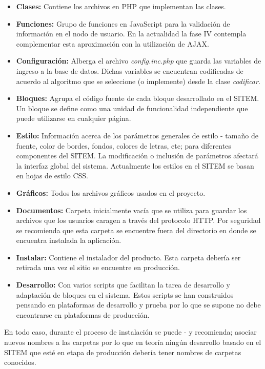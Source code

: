 \begin{itemize}
 \item \textbf{Clases:} Contiene los archivos en PHP que implementan las clases. 
\item \textbf{Funciones:} Grupo de funciones en JavaScript para la validación de información en el nodo de usuario. En la actualidad la fase IV contempla complementar esta aproximación con la utilización de AJAX.
\item \textbf{Configuración:} Alberga el archivo \textit{config.inc.php} que guarda las variables de ingreso a la base de datos. Dichas variables se encuentran codificadas de acuerdo al algoritmo que se seleccione (o implemente) desde la clase \textit{codificar}.
\item \textbf{Bloques:} Agrupa el código fuente de cada bloque desarrollado en el SITEM. Un bloque se define como una unidad de funcionalidad independiente que puede utilizarse en cualquier página.
\item \textbf{Estilo:} Información acerca de los parámetros generales de estilo - tamaño de fuente, color de bordes, fondos, colores de letras, etc; para diferentes componentes del SITEM. La modificación o inclusión de parámetros afectará la interfaz global del sistema. Actualmente los estilos en el SITEM se basan en hojas de estilo CSS.
\item \textbf{Gráficos:} Todos los archivos gráficos usados en el proyecto.
\item \textbf{Documentos:} Carpeta inicialmente vacía que se utiliza para guardar los archivos que los usuarios caragen a través del protocolo HTTP. Por seguridad se recomienda que esta carpeta se encuentre fuera del directorio en donde se encuentra instalada la aplicación.
\item \textbf{Instalar:} Contiene el instalador del producto. Esta carpeta debería ser retirada una vez el sitio se encuentre en producción.
\item \textbf{Desarrollo:} Con varios scripts que facilitan la tarea de desarrollo y adaptación de bloques en el sistema. Estos scripts se han construidos pensando en plataformas de desarrollo y prueba por lo que se supone no debe encontrarse en plataformas de producción.
\end{itemize}

En todo caso, durante el proceso de instalación se puede - y recomienda; asociar nuevos nombres a las carpetas por lo que en teoría ningún desarrollo basado en el SITEM que esté en etapa de producción debería tener nombres de carpetas conocidos.

